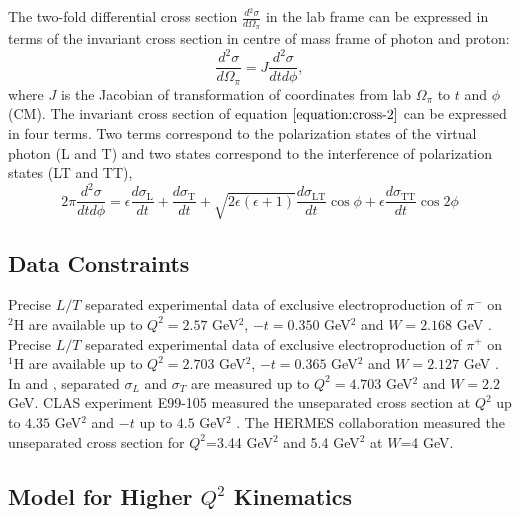 The two-fold differential cross section $\frac{d{^2} \sigma}{d\Omega_{\pi}}$ in
the lab frame can be expressed in terms of the invariant cross section in
centre of mass frame of photon and proton:
\begin{equation}
  \frac{d^2 \sigma}{d\Omega_\pi}= J \frac{d^2 \sigma}{dt d\phi},
  \label{equation:cross-2}
\end{equation}
where $J$ is the Jacobian of transformation of coordinates from lab
$\Omega_{\pi}$ to $t$ and $\phi$ (CM). The invariant cross section of equation
$\ref{equation:cross-2}$ can be expressed in four terms. Two terms correspond
to the polarization states of the virtual photon (L and T) and two states
correspond to the interference of polarization states (LT and TT),
\begin{equation}
  2\pi \frac{d^2 \sigma}{dt d\phi} = \epsilon \frac{d\sigma_{\mathrm{L}}}{dt} +
\frac{d\sigma_{\mathrm{T}}}{dt} + \sqrt{2\epsilon (\epsilon +1)}
\frac{d\sigma_{\mathrm{LT}}}{dt} \cos{\phi} + \epsilon
\frac{d\sigma_{\mathrm{TT}}}{dt} \cos{2 \phi}
  \label{equation:cross-3}
\end{equation}

\subsection{Data Constraints
\label{dataconstraints}}

Precise $L/T$ separated experimental data of exclusive electroproduction of
$\pi^{-}$ on $^2$H are available up to $Q^2=2.57$ GeV$^2$, $-t=0.350$
GeV$^2$ and $W=2.168$ GeV \cite{gmhuber-2}. Precise $L/T$ separated
experimental data of exclusive electroproduction of $\pi^{+}$ on $^1$H are
available up to $Q^2=2.703$ GeV$^2$, $-t=0.365$ GeV$^2$ and $W=2.127$ GeV
\cite{gmhuber}. In \cite{hallc-1} and \cite{hallc-2}, separated $\sigma_{L}$
and $\sigma_{T}$ are measured up to $Q^2=4.703$ GeV$^2$ and $W=2.2$
GeV. CLAS experiment E99-105 measured the unseparated cross section at $Q^2$ up
to $4.35$ GeV$^2$ and $-t$ up to $4.5$ GeV$^2$ \cite{park}.  The HERMES
collaboration measured the unseparated cross section for $Q^2$=3.44 GeV$^2$
and 5.4 GeV$^2$ \cite{hermes} at $W$=4 GeV.

\subsection{Model for Higher $Q^2$ Kinematics
\label{sec:model}}

